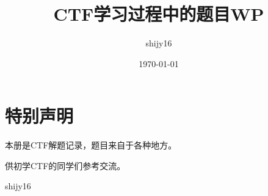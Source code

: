 \documentclass[cn,11pt,chinese]{elegantbook}
\title{CTF学习过程中的题目WP}
\author{shijy16}
\date{\today}
\begin{document}
\maketitle

\chapter*{特别声明}

本册是CTF解题记录，题目来自于各种地方。

供初学CTF的同学们参考交流。

\vskip 1.5cm

\begin{flushright}
shijy16
\end{flushright}


\tableofcontents
\setcounter{page}{1}



\end{document}
